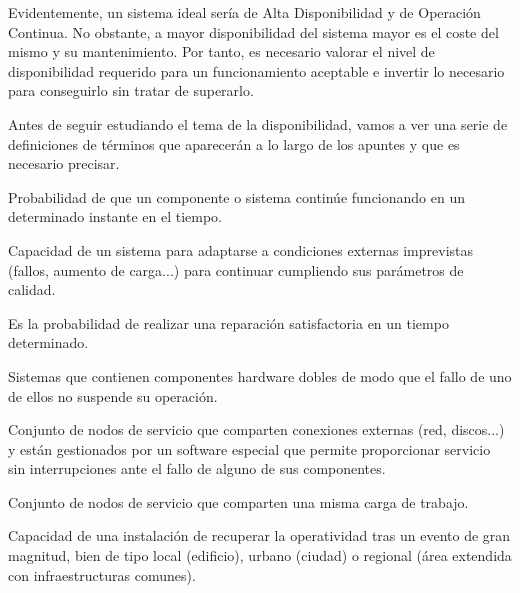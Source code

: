 Evidentemente, un sistema ideal sería de Alta Disponibilidad y de Operación Continua. No obstante, a mayor disponibilidad del sistema mayor es el coste del mismo y su mantenimiento. Por tanto, es necesario valorar el nivel de disponibilidad requerido para un funcionamiento aceptable e invertir lo necesario para conseguirlo sin tratar de superarlo.

Antes de seguir estudiando el tema de la disponibilidad, vamos a ver una serie de definiciones de términos que aparecerán a lo largo de los apuntes y que es necesario precisar.

\begin{defn}
Probabilidad de que un componente o sistema continúe funcionando en un determinado instante en el tiempo.
\end{defn}

\begin{defn}
Capacidad de un sistema para adaptarse a
condiciones externas imprevistas (fallos, aumento de carga...) para continuar cumpliendo sus parámetros de calidad.
\end{defn}

\begin{defn}
Es la probabilidad de realizar una reparación satisfactoria en un tiempo determinado.
\end{defn}

\begin{defn}
Sistemas que contienen
componentes hardware dobles de modo que el fallo de uno de ellos no suspende su
operación.
\end{defn}
\newpage
\begin{defn}
Conjunto de nodos de servicio que comparten conexiones externas (red, discos...) y están gestionados por un software especial que permite proporcionar servicio sin interrupciones ante el fallo de alguno de sus componentes.
\end{defn}

\begin{defn}
Conjunto de nodos de servicio que comparten una misma carga de trabajo.
\end{defn}

\begin{defn}
Capacidad de una instalación de
recuperar la operatividad tras un evento de gran magnitud, bien de tipo local (edificio), urbano (ciudad) o regional (área extendida con infraestructuras comunes).
\end{defn}

